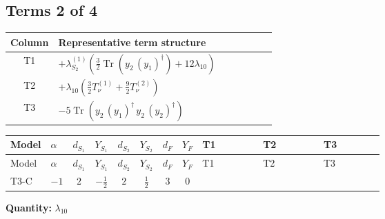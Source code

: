 \documentclass[8pt]{article}
\begin{document}
\begin{landscape}
\subsection*{Terms 2 of 4}
\begin{center}
\begin{tabular}{@{}c >{\raggedright\arraybackslash}p{0.82\linewidth}@{}}
\toprule
Column & Representative term structure \\
\midrule
T1 & \(\displaystyle +{\lambda_{S_2}^{(1)}} \left(\frac{3}{2} \operatorname{Tr}\!\left({y_2}\,\left({y_1}\right)^{\dagger}\right)+12 {\lambda_{10}}\right)\) \\
\midrule
T2 & \(\displaystyle +{\lambda_{10}} \left(\frac{3}{2} T_{\nu}^{(1)}+\frac{9}{2} T_{\nu}^{(2)}\right)\) \\
\midrule
T3 & \(\displaystyle -5 \operatorname{Tr}\!\left({y_2}\,\left({y_1}\right)^{\dagger}\,{y_2}\,\left({y_2}\right)^{\dagger}\right)\) \\
\midrule
\bottomrule
\end{tabular}
\end{center}
\smallskip
\tiny
\begin{longtable}{@{}llcccccc >{\raggedright\arraybackslash}p{0.21\linewidth} >{\raggedright\arraybackslash}p{0.21\linewidth} >{\raggedright\arraybackslash}p{0.21\linewidth}@{}}
\toprule
Model & $\alpha$ & $d_{S_1}$ & $Y_{S_1}$ & $d_{S_2}$ & $Y_{S_2}$ & $d_F$ & $Y_F$ & T1 & T2 & T3 \\
\midrule
\endfirsthead
\toprule
Model & $\alpha$ & $d_{S_1}$ & $Y_{S_1}$ & $d_{S_2}$ & $Y_{S_2}$ & $d_F$ & $Y_F$ & T1 & T2 & T3 \\
\midrule
\endhead
T3-C & $-1$ & $2$ & $-\frac{1}{2}$ & $2$ & $\frac{1}{2}$ & $3$ & $0$ & \scriptsize\adjustbox{max width=\linewidth}{$\begin{gathered} +{\lambda_{S_2}^{(1)}} \left(\frac{3}{2} \operatorname{Tr}\!\left({y_2}\,\left({y_1}\right)^{\dagger}\right)+12 {\lambda_{10}}\right)\end{gathered}$} & \scriptsize\adjustbox{max width=\linewidth}{$\begin{gathered} +{\lambda_{10}} \left(\frac{3}{2} T_{\nu}^{(1)}+\frac{9}{2} T_{\nu}^{(2)}\right)\end{gathered}$} & \scriptsize\adjustbox{max width=\linewidth}{$\begin{gathered} -5 \operatorname{Tr}\!\left({y_2}\,\left({y_1}\right)^{\dagger}\,{y_2}\,\left({y_2}\right)^{\dagger}\right)\end{gathered}$} \\
\midrule
\bottomrule
\end{longtable}
\clearpage
\noindent\textbf{Quantity: }$\lambda_{10}$\par\smallskip

\end{landscape}
\end{document}
